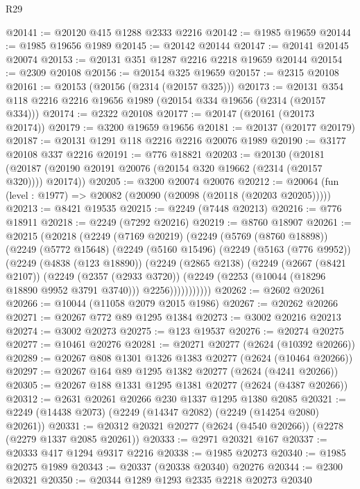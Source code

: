 \begin{lexlean}{R29}
\begin{coremodule}
@20141 := @20120 @415 @1288 @2333 @2216
@20142 := @1985 @19659
@20144 := @1985 @19656 @1989
@20145 := @20142 @20144
@20147 := @20141 @20145 @20074
@20153 := @20131 @351 @1287 @2216 @2218 @19659 @20144
@20154 := @2309 @20108
@20156 := @20154 @325 @19659
@20157 := @2315 @20108
@20161 := @20153 (@20156 (@2314 (@20157 @325)))
@20173 := @20131 @354 @118 @2216 @2216 @19656 @1989 (@20154 @334 @19656 (@2314 (@20157 @334)))
@20174 := @2322 @20108
@20177 := @20147 (@20161 (@20173 @20174))
@20179 := @3200 @19659 @19656
@20181 := @20137 (@20177 @20179)
@20187 := @20131 @1291 @118 @2216 @2216 @20076 @1989
@20190 := @3177 @20108 @337 @2216
@20191 := @776 @18821
@20203 := @20130
    (@20181 (@20187 (@20190 @20191 @20076 (@20154 @320 @19662 (@2314 (@20157 @320)))) @20174))
@20205 := @3200 @20074 @20076
@20212 := @20064 (fun (level : @1977) => @20082 (@20090 (@20098 (@20118 (@20203 @20205)))))
@20213 := @8421 @19535
@20215 := @2249 (@7448 @20213)
@20216 := @776 @18911
@20218 := @2249 (@7292 @20216)
@20219 := @8760 @18907
@20261 := @20215
    (@20218
      (@2249
        (@7169 @20219)
        (@2249
          (@5769 (@8760 @18898))
          (@2249
            (@5772 @15648)
            (@2249
              (@5160 @15496)
              (@2249
                (@5163 (@776 @9952))
                (@2249
                  (@4838 (@123 @18890))
                  (@2249
                    (@2865 @2138)
                    (@2249
                      (@2667 (@8421 @2107))
                      (@2249
                        (@2357 (@2933 @3720))
                        (@2249 (@2253 (@10044 (@18296 @18890 @9952 @3791 @3740))) @2256)))))))))))
@20262 := @2602 @20261
@20266 := @10044 (@11058 @2079 @2015 @1986)
@20267 := @20262 @20266
@20271 := @20267 @772 @89 @1295 @1384
@20273 := @3002 @20216 @20213
@20274 := @3002 @20273
@20275 := @123 @19537
@20276 := @20274 @20275
@20277 := @10461 @20276
@20281 := @20271 @20277 (@2624 (@10392 @20266))
@20289 := @20267 @808 @1301 @1326 @1383 @20277 (@2624 (@10464 @20266))
@20297 := @20267 @164 @89 @1295 @1382 @20277 (@2624 (@4241 @20266))
@20305 := @20267 @188 @1331 @1295 @1381 @20277 (@2624 (@4387 @20266))
@20312 := @2631 @20261 @20266 @230 @1337 @1295 @1380 @2085
@20321 := @2249 (@14438 @2073) (@2249 (@14347 @2082) (@2249 (@14254 @2080) @20261))
@20331 := @20312 @20321 @20277 (@2624 (@4540 @20266)) (@2278 (@2279 @1337 @2085 @20261))
@20333 := @2971 @20321 @167
@20337 := @20333 @417 @1294 @9317 @2216
@20338 := @1985 @20273
@20340 := @1985 @20275 @1989
@20343 := @20337 (@20338 @20340) @20276
@20344 := @2300 @20321
@20350 := @20344 @1289 @1293 @2335 @2218 @20273 @20340

\end{coremodule}
\end{lexlean}
